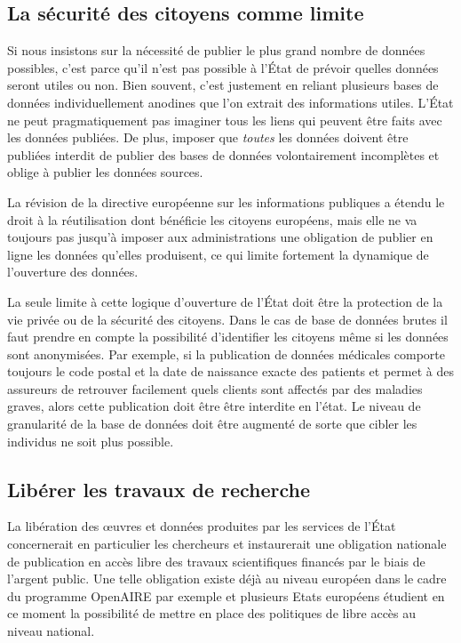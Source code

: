 \subsection{La sécurité des citoyens comme limite}
Si nous insistons sur la nécessité de publier le plus grand nombre de données possibles, c'est parce qu'il n'est pas possible à l'État de prévoir quelles données seront utiles ou non. Bien souvent, c'est justement en reliant plusieurs bases de données individuellement anodines que l'on extrait des informations utiles. L'État ne peut pragmatiquement pas imaginer tous les liens qui peuvent être faits avec les données publiées. De plus, imposer que \emph{toutes} les données doivent être publiées interdit de publier des bases de données volontairement incomplètes et oblige à publier les données sources. 

La révision de la directive européenne sur les informations publiques a étendu le droit à la réutilisation dont bénéficie les citoyens européens, mais elle ne va toujours pas jusqu'à imposer aux administrations une obligation de publier en ligne les données qu'elles produisent, ce qui limite fortement la dynamique de l'ouverture des données.


La seule limite à cette logique d'ouverture de l'État doit être la protection de la vie privée ou de la sécurité des citoyens. Dans le cas de base de données brutes il faut prendre en compte la possibilité d'identifier les citoyens même si les données sont anonymisées. Par exemple, si la publication de données médicales comporte toujours le code postal et la date de naissance exacte des patients et permet à des assureurs de retrouver facilement quels clients sont affectés par des maladies graves, alors cette publication doit être être interdite en l'état. Le niveau de granularité de la base de données doit être augmenté de sorte que cibler les individus ne soit plus possible.

\subsection{Libérer les travaux de recherche}

La libération des œuvres et données produites par les services de l’État concernerait en particulier les chercheurs et instaurerait une obligation nationale de publication en accès libre des travaux scientifiques financés par le biais de l'argent public. Une telle obligation existe déjà au niveau européen dans le cadre du programme OpenAIRE par exemple et plusieurs Etats européens étudient en ce moment la possibilité de mettre en place des politiques de libre accès au niveau national.

